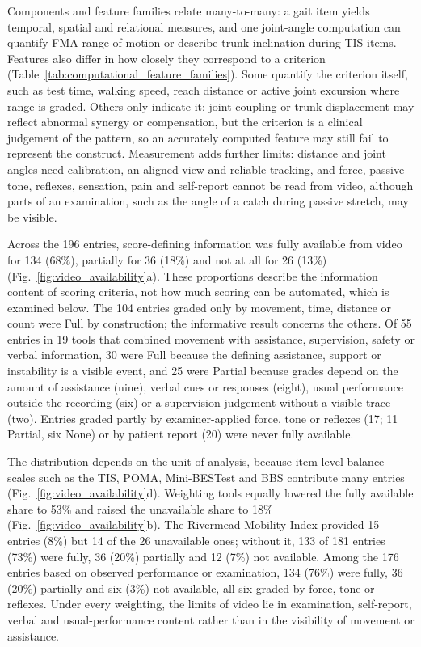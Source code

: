 \documentclass[11pt]{article}
\begin{document}
Components and feature families relate many-to-many: a gait item yields temporal, spatial and relational measures, and one joint-angle computation can quantify FMA range of motion or describe trunk inclination during TIS items. Features also differ in how closely they correspond to a criterion (Table~\ref{tab:computational_feature_families}). Some quantify the criterion itself, such as test time, walking speed, reach distance or active joint excursion where range is graded. Others only indicate it: joint coupling or trunk displacement may reflect abnormal synergy or compensation, but the criterion is a clinical judgement of the pattern, so an accurately computed feature may still fail to represent the construct. Measurement adds further limits: distance and joint angles need calibration, an aligned view and reliable tracking, and force, passive tone, reflexes, sensation, pain and self-report cannot be read from video, although parts of an examination, such as the angle of a catch during passive stretch, may be visible.



Across the 196 entries, score-defining information was fully available from video for 134 (68\%), partially for 36 (18\%) and not at all for 26 (13\%) (Fig.~\ref{fig:video_availability}a). These proportions describe the information content of scoring criteria, not how much scoring can be automated, which is examined below. The 104 entries graded only by movement, time, distance or count were Full by construction; the informative result concerns the others. Of 55 entries in 19 tools that combined movement with assistance, supervision, safety or verbal information, 30 were Full because the defining assistance, support or instability is a visible event, and 25 were Partial because grades depend on the amount of assistance (nine), verbal cues or responses (eight), usual performance outside the recording (six) or a supervision judgement without a visible trace (two). Entries graded partly by examiner-applied force, tone or reflexes (17; 11 Partial, six None) or by patient report (20) were never fully available.

The distribution depends on the unit of analysis, because item-level balance scales such as the TIS, POMA, Mini-BESTest and BBS contribute many entries (Fig.~\ref{fig:video_availability}d). Weighting tools equally lowered the fully available share to 53\% and raised the unavailable share to 18\% (Fig.~\ref{fig:video_availability}b). The Rivermead Mobility Index provided 15 entries (8\%) but 14 of the 26 unavailable ones; without it, 133 of 181 entries (73\%) were fully, 36 (20\%) partially and 12 (7\%) not available. Among the 176 entries based on observed performance or examination, 134 (76\%) were fully, 36 (20\%) partially and six (3\%) not available, all six graded by force, tone or reflexes. Under every weighting, the limits of video lie in examination, self-report, verbal and usual-performance content rather than in the visibility of movement or assistance.
\end{document}
